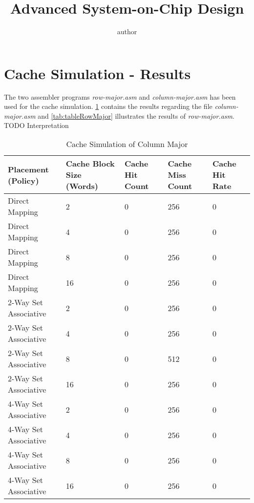\documentclass[11pt,a4paper]{article}
\title{Advanced System-on-Chip Design}
\author{author}
\begin{document}


\tableofcontents
\newpage

\section{Cache Simulation - Results}
The two assembler programs \textit{row-major.asm} and \textit{column-major.asm} has been used for the cache simulation. \ref{tab:tableColumnMajor} contains the results regarding the file \textit{column-major.asm} and \ref{tab:tableRowMajor} illustrates the results of \textit{row-major.asm}.\\
TODO Interpretation



\begin{table}
\centering
\caption{Cache Simulation of Column Major}
\label{tab:tableColumnMajor}
\begin{tabular}{lllll}
\hline %
Placement (Policy) & Cache Block Size (Words) & Cache Hit Count & Cache Miss Count & Cache Hit Rate \\
\hline %
Direct Mapping & 2 & 0 & 256 & 0  \\
Direct Mapping & 4 & 0 & 256 & 0  \\
Direct Mapping & 8 & 0 & 256 & 0  \\
Direct Mapping & 16 & 0 & 256 & 0  \\
2-Way Set Associative & 2 & 0 & 256 & 0 \\
2-Way Set Associative & 4 & 0 & 256 & 0 \\
2-Way Set Associative & 8 & 0 & 512 & 0 \\
2-Way Set Associative & 16 & 0 & 256 & 0 \\
4-Way Set Associative & 2 & 0 & 256 & 0 \\
4-Way Set Associative & 4 & 0 & 256 & 0 \\
4-Way Set Associative & 8 & 0 & 256 & 0 \\
4-Way Set Associative & 16 & 0 & 256 & 0 \\
\hline %
\end{tabular} 
\end{table}
\end{document}
